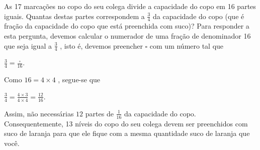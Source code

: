 \begin{multicols}{2}
\begin{orientacoes}{}{}



\end{orientacoes}

\begin{solucao}{}{}
  As 17 marcações no copo do seu colega divide a capacidade do copo em 16 partes
iguais. Quantas destas partes correspondem a   $\frac{3}{4}$   da capacidade do
copo (que é fração da capacidade do copo que está preenchida com suco)? Para
responder a esta pergunta, devemos calcular o numerador de uma fração de
denominador 16 que seja igual a   $\frac{3}{4}$  , isto é, devemos preencher
$\square$   com um número tal que

  $\frac{3}{4} = \frac{\square}{16}$.

  Como   $16 = 4 \times 4$  , segue-se que

  $\frac{3}{4} = \frac{4 \times 3}{4 \times 4} = \frac{12}{16}$.

  Assim, não necessárias   $12$   partes de   $\frac{1}{16}$   da capacidade do
copo. Consequentemente,
  13 níveis do copo do seu colega devem ser preenchidos com suco de laranja para
que ele fique com a mesma quantidade suco de laranja que você.


\begin{center}
\end{center}
\end{solucao}
\end{multicols}
